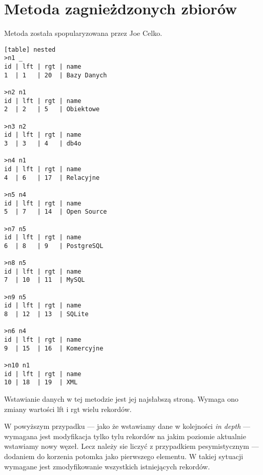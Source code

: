 \section{Metoda zagnieżdzonych zbiorów}

Metoda została spopularyzowana przez Joe Celko\cite{celko-sql}.







\begin{verbatim}[table] nested
>n1 _
id | lft | rgt | name
1  | 1   | 20  | Bazy Danych

>n2 n1
id | lft | rgt | name
2  | 2   | 5   | Obiektowe

>n3 n2
id | lft | rgt | name
3  | 3   | 4   | db4o

>n4 n1
id | lft | rgt | name
4  | 6   | 17  | Relacyjne

>n5 n4
id | lft | rgt | name
5  | 7   | 14  | Open Source

>n7 n5
id | lft | rgt | name
6  | 8   | 9   | PostgreSQL

>n8 n5
id | lft | rgt | name
7  | 10  | 11  | MySQL

>n9 n5
id | lft | rgt | name
8  | 12  | 13  | SQLite

>n6 n4
id | lft | rgt | name
9  | 15  | 16  | Komercyjne

>n10 n1
id | lft | rgt | name
10 | 18  | 19  | XML

\end{verbatim}







Wstawianie danych w tej metodzie jest jej najsłabszą stroną.
Wymaga ono zmiany wartości lft i rgt wielu rekordów.

W powyższym przypadku
--- jako że wstawiamy dane w kolejności \emph{in depth} ---
wymagana jest modyfikacja tylko tylu rekordów na jakim poziomie aktualnie wstawiamy nowy węzeł.
Lecz należy sie liczyć z przypadkiem pesymistycznym --- dodaniem do korzenia potomka jako pierwszego elementu.
W takiej sytuacji wymagane jest zmodyfikowanie wszystkich istniejących rekordów.

